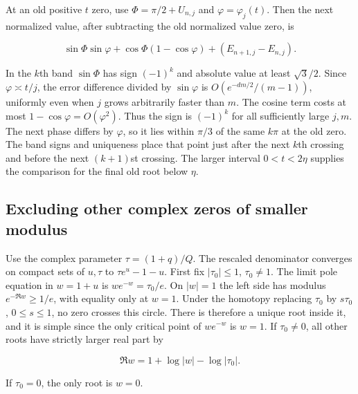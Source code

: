\documentclass[11pt]{article}
\begin{document}
At an old positive \(t\) zero, use \(\Phi=\pi/2+U_{n,j}\) and \(\varphi=\varphi_j(t)\). Then the next normalized value, after subtracting the old normalized value zero, is

\begin{equation*}
\sin\Phi\sin\varphi+\cos\Phi(1-\cos\varphi)+(E_{n+1,j}-E_{n,j}).
\end{equation*}

In the \(k\)th band \(\sin\Phi\) has sign \((-1)^k\) and absolute value at least \(\sqrt3/2\). Since \(\varphi\asymp t/j\), the error difference divided by \(\sin\varphi\) is \(O(e^{-dm/2}/(m-1))\), uniformly even when \(j\) grows arbitrarily faster than \(m\). The cosine term costs at most \(1-\cos\varphi=O(\varphi^2)\). Thus the sign is \((-1)^k\) for all sufficiently large \(j,m\). The next phase differs by \(\varphi\), so it lies within \(\pi/3\) of the same \(k\pi\) at the old zero. The band signs and uniqueness place that point just after the next \(k\)th crossing and before the next \((k+1)\)st crossing. The larger interval \(0<t<2\eta\) supplies the comparison for the final old root below \(\eta\).

\subsection{Excluding other complex zeros of smaller modulus}
\label{sec:excluding-other-complex-zeros-of-smaller-modulus}

Use the complex parameter \(\tau=(1+q)/Q\). The rescaled denominator converges on compact sets of \(u,\tau\) to \(\tau e^u-1-u\). First fix \(|\tau_0|\le1\), \(\tau_0\ne1\). The limit pole equation in \(w=1+u\) is \(we^{-w}=\tau_0/e\). On \(|w|=1\) the left side has modulus \(e^{-\Re w}\ge1/e\), with equality only at \(w=1\). Under the homotopy replacing \(\tau_0\) by \(s\tau_0\), \(0\le s\le1\), no zero crosses this circle. There is therefore a unique root inside it, and it is simple since the only critical point of \(we^{-w}\) is \(w=1\). If \(\tau_0\ne0\), all other roots have strictly larger real part by

\begin{equation*}
\Re w=1+\log |w|-\log|\tau_0|.
\end{equation*}

If \(\tau_0=0\), the only root is \(w=0\).
\end{document}
